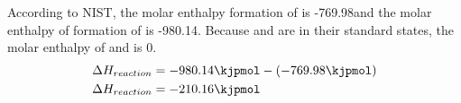 \documentclass[demo, 12pt, notitlepage, letterpaper]{report}
\begin{document}
According to NIST, the molar enthalpy formation of  is -769.98\kjpmol and the molar enthalpy of formation of  is -980.14\kjpmol . Because  and  are in their standard states, the molar enthalpy of  and  is 0\kjpmol .
\begin{align*}
	\Delta H_{reaction} & = -980.14\kjpmol - (-769.98\kjpmol) \\
	\Delta H_{reaction} & = -210.16\kjpmol
\end{align*}

\end{document}
